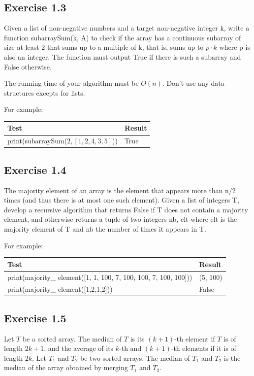 \documentclass[10pt,a4paper]{article}
\begin{document}
\subsection*{Exercise 1.3}
Given a list of non-negative numbers and a target non-negative integer k, write a function subarraySum(k, A) to check if the array has a continuous subarray of size at least $2$ that sums up to a multiple of k, that is, sums up to $p \cdot k$ where p is also an integer. The function must output True if there is such a subarray and False otherwise.

The running time of your algorithm must be $O(n)$. Don't use any data structures excepts for lists.


For example:
\begin{center}
\begin{tabular}{| l | l |}
\hline
Test	 &Result\\
\hline
print(subarraySum($2, [1,2,4,3,5]$)) & True\\
\hline
\end{tabular}
\end{center}


\subsection*{Exercise 1.4}
The majority element of an array is the element that appears  more than  n/2 times (and thus there is at most one such element). Given a list of integers T, develop a recursive algorithm that returns False if T does not contain a majority element, and otherwise returns a tuple of two integers nb, elt where elt is the majority element of T and nb the number of times it appears in T.


For example:
 \begin{center}
\begin{tabular}{| l | l |}
\hline
Test	& Result\\
\hline
print(majority\_ element([1, 1, 100, 7, 100, 100, 7, 100, 100])) & (5, 100)\\
\hline
print(majority\_ element([1,2,1,2])) & False\\
\hline
\end{tabular}
\end{center}
 
\subsection*{Exercise 1.5}
Let $T$ be a sorted array. The median of $T$ is its $(k+1)$-th element if $T$ is of length $2k+1$, and the average of its $k$-th and $(k+1)$-th elements if it is of length $2k$. Let $T_1$ and $T_2$ be two sorted arrays. The median of $T_1$  and $T_2$ is the median of the array obtained by merging $T_1$ and $T_2$. 
\end{document}
